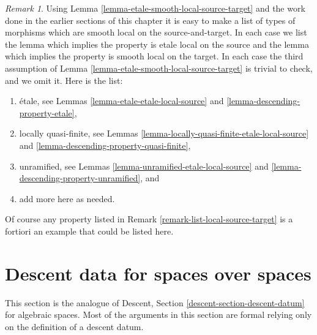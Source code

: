 \documentclass{stacks-project}
\theoremstyle{plain}
\theoremstyle{definition}
\theoremstyle{remark}
\newtheorem{remark}[subsection]{Remark}
\numberwithin{equation}{subsection}
\begin{document}
\begin{remark}
\label{remark-list-etale-smooth-local-source-target}
Using Lemma \ref{lemma-etale-smooth-local-source-target}
and the work done in the earlier sections of this chapter it is easy
to make a list of types of morphisms which are smooth local on the
source-and-target. In each case we list the lemma which implies
the property is etale local on the source and the lemma which implies
the property is smooth local on the target. In each case the third assumption
of Lemma \ref{lemma-etale-smooth-local-source-target}
is trivial to check, and we omit it. Here is the list:
\begin{enumerate}
\item \'etale, see
Lemmas \ref{lemma-etale-etale-local-source} and
\ref{lemma-descending-property-etale},
\item locally quasi-finite, see
Lemmas \ref{lemma-locally-quasi-finite-etale-local-source} and
\ref{lemma-descending-property-quasi-finite},
\item unramified, see
Lemmas \ref{lemma-unramified-etale-local-source} and
\ref{lemma-descending-property-unramified}, and
\item add more here as needed.
\end{enumerate}
Of course any property listed in
Remark \ref{remark-list-local-source-target}
is a fortiori an example that could be listed here.
\end{remark}







\section{Descent data for spaces over spaces}
\label{section-descent-datum}

\noindent
This section is the analogue of Descent, Section
\ref{descent-section-descent-datum} for algebraic spaces.
Most of the arguments in this section are formal relying only
on the definition of a descent datum.
\end{document}
